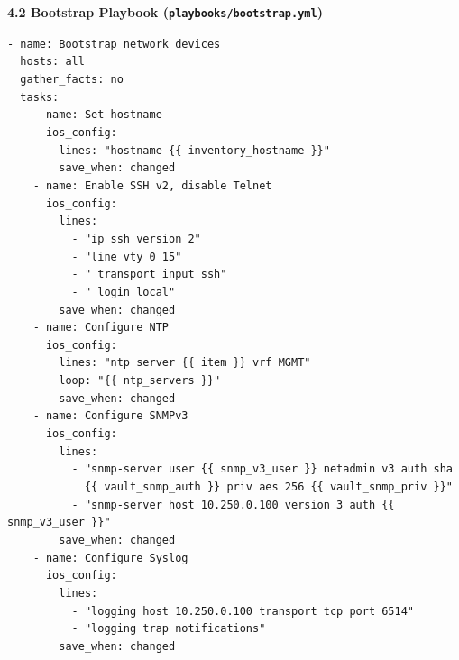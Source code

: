 \documentclass[11pt]{article}
\begin{document}
\begin{exoresolu}
\medskip
\textbf{4.2 Bootstrap Playbook (\texttt{playbooks/bootstrap.yml})}\par
\texttt{- name: Bootstrap network devices}\\
\texttt{\ \ hosts: all}\\
\texttt{\ \ gather\_facts: no}\\
\texttt{\ \ tasks:}\\
\texttt{\ \ \ \ - name: Set hostname}\\
\texttt{\ \ \ \ \ \ ios\_config:}\\
\texttt{\ \ \ \ \ \ \ \ lines: "hostname \{\{ inventory\_hostname \}\}"}\\
\texttt{\ \ \ \ \ \ \ \ save\_when: changed}\\
\texttt{\ \ \ \ - name: Enable SSH v2, disable Telnet}\\
\texttt{\ \ \ \ \ \ ios\_config:}\\
\texttt{\ \ \ \ \ \ \ \ lines:}\\
\texttt{\ \ \ \ \ \ \ \ \ \ - "ip ssh version 2"}\\
\texttt{\ \ \ \ \ \ \ \ \ \ - "line vty 0 15"}\\
\texttt{\ \ \ \ \ \ \ \ \ \ - " transport input ssh"}\\
\texttt{\ \ \ \ \ \ \ \ \ \ - " login local"}\\
\texttt{\ \ \ \ \ \ \ \ save\_when: changed}\\
\texttt{\ \ \ \ - name: Configure NTP}\\
\texttt{\ \ \ \ \ \ ios\_config:}\\
\texttt{\ \ \ \ \ \ \ \ lines: "ntp server \{\{ item \}\} vrf MGMT"}\\
\texttt{\ \ \ \ \ \ \ \ loop: "\{\{ ntp\_servers \}\}"}\\
\texttt{\ \ \ \ \ \ \ \ save\_when: changed}\\
\texttt{\ \ \ \ - name: Configure SNMPv3}\\
\texttt{\ \ \ \ \ \ ios\_config:}\\
\texttt{\ \ \ \ \ \ \ \ lines:}\\
\texttt{\ \ \ \ \ \ \ \ \ \ - "snmp-server user \{\{ snmp\_v3\_user \}\} netadmin v3 auth sha}\\
\texttt{\ \ \ \ \ \ \ \ \ \ \ \ \{\{ vault\_snmp\_auth \}\} priv aes 256 \{\{ vault\_snmp\_priv \}\}"}\\
\texttt{\ \ \ \ \ \ \ \ \ \ - "snmp-server host 10.250.0.100 version 3 auth \{\{ snmp\_v3\_user \}\}"}\\
\texttt{\ \ \ \ \ \ \ \ save\_when: changed}\\
\texttt{\ \ \ \ - name: Configure Syslog}\\
\texttt{\ \ \ \ \ \ ios\_config:}\\
\texttt{\ \ \ \ \ \ \ \ lines:}\\
\texttt{\ \ \ \ \ \ \ \ \ \ - "logging host 10.250.0.100 transport tcp port 6514"}\\
\texttt{\ \ \ \ \ \ \ \ \ \ - "logging trap notifications"}\\
\texttt{\ \ \ \ \ \ \ \ save\_when: changed}


\end{exoresolu}
\end{document}
